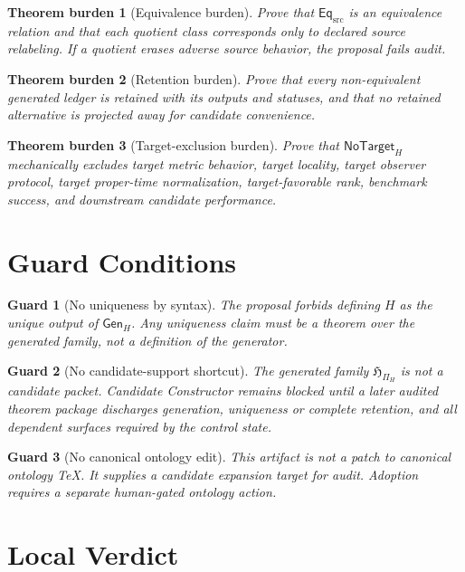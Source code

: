 \documentclass[11pt]{article}
\newcommand{\LedgerFam}{\mathfrak{H}}
\newcommand{\PiH}{\Pi_H}
\newcommand{\GenH}{\mathsf{Gen}_{H}}
\newcommand{\EqSrc}{\mathsf{Eq}_{\mathrm{src}}}
\newcommand{\NoTarget}{\mathsf{NoTarget}}
\newtheorem{burden}{Theorem burden}
\newtheorem{guard}{Guard}
\begin{document}
\begin{burden}[Equivalence burden]
Prove that \(\EqSrc\) is an equivalence relation and that each quotient
class corresponds only to declared source relabeling. If a quotient erases
adverse source behavior, the proposal fails audit.
\end{burden}

\begin{burden}[Retention burden]
Prove that every non-equivalent generated ledger is retained with its
outputs and statuses, and that no retained alternative is projected away
for candidate convenience.
\end{burden}

\begin{burden}[Target-exclusion burden]
Prove that \(\NoTarget_H\) mechanically excludes target metric behavior,
target locality, target observer protocol, target proper-time
normalization, target-favorable rank, benchmark success, and downstream
candidate performance.
\end{burden}

\section{Guard Conditions}

\begin{guard}[No uniqueness by syntax]
The proposal forbids defining \(H\) as the unique output of \(\GenH\). Any
uniqueness claim must be a theorem over the generated family, not a
definition of the generator.
\end{guard}

\begin{guard}[No candidate-support shortcut]
The generated family \(\LedgerFam_{\PiH}\) is not a candidate packet.
Candidate Constructor remains blocked until a later audited theorem package
discharges generation, uniqueness or complete retention, and all dependent
surfaces required by the control state.
\end{guard}

\begin{guard}[No canonical ontology edit]
This artifact is not a patch to canonical ontology TeX. It supplies a
candidate expansion target for audit. Adoption requires a separate
human-gated ontology action.
\end{guard}

\section{Local Verdict}
\end{document}
